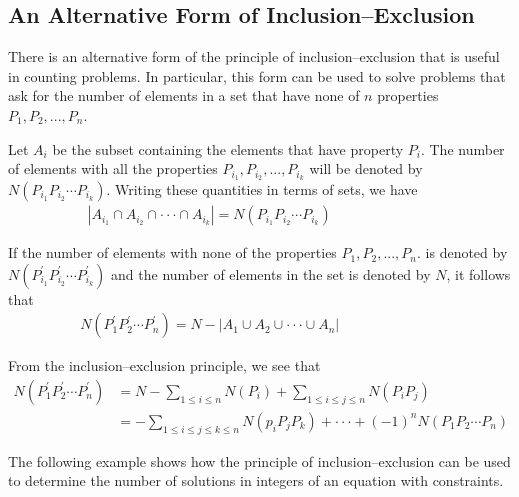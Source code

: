 \documentclass[11pt]{article}
\begin{document}
\subsection{An Alternative Form of Inclusion–Exclusion}

There is an alternative form of the principle of inclusion–exclusion that is useful in counting problems. In particular, this form can be used to solve problems that ask for the number of elements in a set that have none of $n$ properties $P_1, P_2, ..., P_n$.

Let $A_i$ be the subset containing the elements that have property $P_i$. The number of elements with all the properties $P_{i_1}, P_{i_2}, ..., P_{i_k}$ will be denoted by $N(P_{i_1} P_{i_2} \cdots P_{i_k})$. Writing these quantities in terms of sets, we have
\begin{align*}
    &|A_{i_1} \cap A_{i_2} \cap \cdot \cdot \cdot \cap A_{i_k}| = N(P_{i_1} P_{i_2} \cdots P_{i_k}) & & & & & & & & & &
\end{align*}

\noindent If the number of elements with none of the properties $P_1, P_2, ..., P_n$. is denoted by $N(P_{i_1}^{'} P_{i_2}^{'} \cdots P_{i_k}^{'})$ and the number of elements in the set is denoted by $N$, it follows that
\begin{align*}
    &N(P_{1}^{'} P_{2}^{'} \cdots P_{n}^{'}) = N - |A_1 \cup A_2 \cup \cdot \cdot \cdot \cup A_n| & & & & & & & & & &
\end{align*}

\noindent From the inclusion–exclusion principle, we see that
\begin{align*}
    N(P_{1}^{'} P_{2}^{'} \cdots P_{n}^{'}) &= N - \sum_{1 \leq i \leq n} N(P_i) + \sum_{1 \leq i \leq j \leq n} N(P_iP_j)\\
    &=-\sum_{1 \leq i \leq j \leq k \leq n} N(p_iP_jP_k) + \cdot \cdot \cdot + (-1)^n N(P_1P_2 \cdots P_n)
\end{align*}

The following example shows how the principle of inclusion–exclusion can be used to determine the number of solutions in integers of an equation with constraints.
\end{document}
